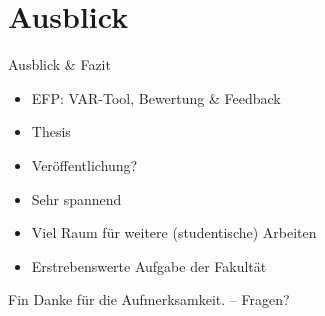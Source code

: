 \documentclass[compress]{beamer}
\begin{document}
\section{Ausblick}
\begin{frame}{Ausblick \& Fazit}
  \begin{itemize}
    \item EFP: VAR-Tool, Bewertung \& Feedback
    \item Thesis
    \item Veröffentlichung?
  \end{itemize}
  \begin{itemize}
    \item Sehr spannend
    \item Viel Raum für weitere (studentische) Arbeiten
    \item Erstrebenswerte Aufgabe der Fakultät
  \end{itemize}
\end{frame}

\begin{frame}{Fin}
  Danke für die Aufmerksamkeit. -- Fragen?
\end{frame}
\end{document}
